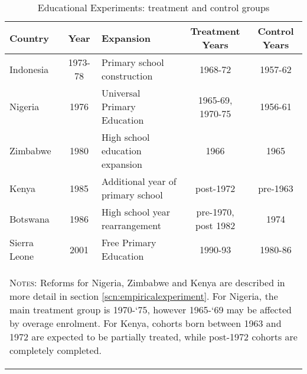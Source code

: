 \begin{table}[htpb]
\begin{center}
\begin{tabular}{lclcc}
\toprule
Country & Year & Expansion & Treatment Years & Control Years \\ 
\midrule
Indonesia & 1973-78 & Primary school construction & 1968-72 & 1957-62  \\
Nigeria & 1976 & Universal Primary Education & 1965-69, 1970-75 & 1956-61 \\
Zimbabwe & 1980 & High school education expansion & 1966 & 1965 \\
Kenya & 1985 & Additional year of primary school & post-1972 & pre-1963 \\
Botswana & 1986 & High school year rearrangement & pre-1970, post 1982  & 1974 \\
Sierra Leone & 2001 & Free Primary Education & 1990-93 & 1980-86 \\
\bottomrule
\multicolumn{5}{p{15cm}}{\begin{footnotesize}\textsc{Notes:}
    Reforms for Nigeria, Zimbabwe and Kenya are described in more detail in
    section \ref{scn:empiricalexperiment}.  For Nigeria, the main treatment
    group is 1970-`75, however 1965-`69 may be affected by overage enrolment.
    For Kenya, cohorts born between 1963 and 1972 are expected to be partially
    treated, while post-1972 cohorts are completely completed.
\end{footnotesize}}
\end{tabular}
\caption{Educational Experiments: treatment and control groups}
\label{EducExp}
\end{center}
\end{table}



